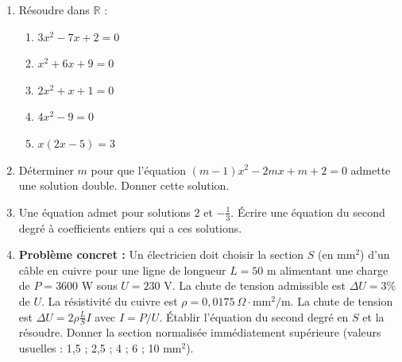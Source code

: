 \documentclass[11pt]{article}
\begin{document}
\begin{exercice}
\begin{enumerate}
    \item Résoudre dans $\mathbb{R}$ :
    \begin{enumerate}
        \item $3x^2 - 7x + 2 = 0$
        \item $x^2 + 6x + 9 = 0$
        \item $2x^2 + x + 1 = 0$
        \item $4x^2 - 9 = 0$
        \item $x(2x-5) = 3$
    \end{enumerate}
    \item Déterminer $m$ pour que l'équation $(m-1)x^2 - 2mx + m+2 = 0$ admette une solution double. Donner cette solution.
    \item Une équation admet pour solutions $2$ et $-\frac{1}{3}$. Écrire une équation du second degré à coefficients entiers qui a ces solutions.
    \item \textbf{Problème concret :} Un électricien doit choisir la section $S$ (en mm$^2$) d'un câble en cuivre pour une ligne de longueur $L=50$ m alimentant une charge de $P=3600$ W sous $U=230$ V. La chute de tension admissible est $\Delta U = 3\%$ de $U$. La résistivité du cuivre est $\rho = 0,0175\ \Omega\cdot\text{mm}^2/\text{m}$.
    La chute de tension est $\Delta U = 2 \rho \frac{L}{S} I$ avec $I = P/U$.
    Établir l'équation du second degré en $S$ et la résoudre. Donner la section normalisée immédiatement supérieure (valeurs usuelles : 1,5 ; 2,5 ; 4 ; 6 ; 10 mm$^2$).
\end{enumerate}
\end{exercice}
\end{document}
